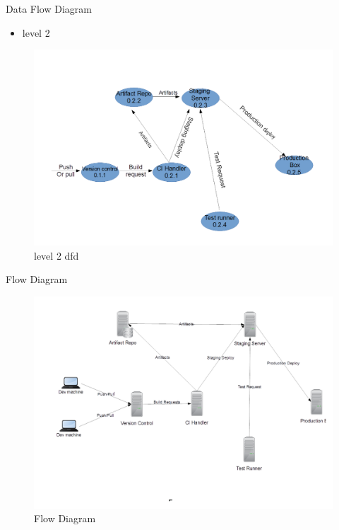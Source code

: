 \documentclass{beamer}
\begin{document}
\begin{frame}{Data Flow Diagram}
\begin{itemize}
\item level 2
\end{itemize}
\begin{figure}[h]
\begin{center}
\includegraphics[scale=0.28]{dfd3.png}
\caption{level 2 dfd}
\end{center}
\end{figure}
\end{frame}

\begin{frame}{Flow Diagram}

\begin{figure}[h]
\begin{center}
\includegraphics[scale=0.28]{flow1.png}
\caption{Flow Diagram}
\end{center}
\end{figure}
\end{frame}
\end{document}

